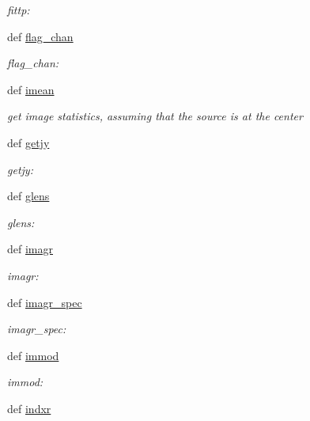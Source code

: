 \begin{DoxyCompactItemize}
\begin{DoxyCompactList}\small\item\em fittp\-: \end{DoxyCompactList}\item 
def \hyperlink{namespacefringe__tasks_a81e3e38505a3b24916e2db5c971e0412}{flag\-\_\-chan}
\begin{DoxyCompactList}\small\item\em flag\-\_\-chan\-: \end{DoxyCompactList}\item 
def \hyperlink{namespacefringe__tasks_a5f4412285ebbc9b8bfa52dac3013971d}{imean}
\begin{DoxyCompactList}\small\item\em get image statistics, assuming that the source is at the center \end{DoxyCompactList}\item 
def \hyperlink{namespacefringe__tasks_a70bedc36e17d450c738de38d5e181950}{getjy}
\begin{DoxyCompactList}\small\item\em getjy\-: \end{DoxyCompactList}\item 
def \hyperlink{namespacefringe__tasks_a6218cbbf14296bde7a4d3c34df810881}{glens}
\begin{DoxyCompactList}\small\item\em glens\-: \end{DoxyCompactList}\item 
def \hyperlink{namespacefringe__tasks_a2b556d9b42b51e0cd2d5d85bb78b4131}{imagr}
\begin{DoxyCompactList}\small\item\em imagr\-: \end{DoxyCompactList}\item 
def \hyperlink{namespacefringe__tasks_a8933e5caa44cb2352a73fd4db3243342}{imagr\-\_\-spec}
\begin{DoxyCompactList}\small\item\em imagr\-\_\-spec\-: \end{DoxyCompactList}\item 
def \hyperlink{namespacefringe__tasks_a04f06940eebbbba2a7654fa55f0186a6}{immod}
\begin{DoxyCompactList}\small\item\em immod\-: \end{DoxyCompactList}\item 
def \hyperlink{namespacefringe__tasks_a3cc971405e68663139f08f401a2c1630}{indxr}

\end{DoxyCompactItemize}
